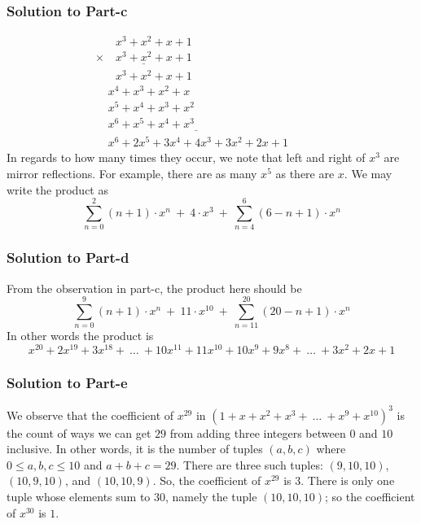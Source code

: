 \documentclass[12pt]{article}
\begin{document}
\subsubsection*{Solution to Part-c}
\begin{equation*}
	\begin{array}{c}
		\phantom{\times99}x^3+x^2+x+1\\
		\underline{\times\phantom{99} x^3+x^2+x+1}\\
		\phantom{\times99}x^3+x^2+x+1\\
		\phantom\times x^4+x^3+x^2+x\phantom{9999}\\
		\phantom\times x^5+x^4+x^3+x^2\phantom{99999999999}\\
		\underline{\phantom\times x^6+x^5+x^4+x^3\phantom{999999999999999999}}\\
		\phantom\times x^6+2x^5+3x^4+4x^3+3x^2+2x+1\phantom{9999999}
	\end{array}
\end{equation*}
In regards to how many times they occur, we note that left and right of $x^3$ are mirror reflections. For example, there are as many $x^5$ as there are $x$. We may write the product as
\[
\sum_{n=0}^{2}(n+1) \cdot x^n\ +\ 4 \cdot x^3\ +\ \sum_{n=4}^{6} (6-n+1) \cdot x^n
\]

\subsubsection*{Solution to Part-d}
From the observation in part-c, the product here should be
\[
\sum_{n=0}^{9}(n+1) \cdot x^n\ +\ 11 \cdot x^{10}\ +\ \sum_{n=11}^{20}(20-n+1) \cdot x^n
\]
In other words the product is 
\[
x^{20}+2x^{19}+3x^{18}+\ \ldots\ +10x^{11}+11x^{10}+10x^9+9x^8+\ \ldots\ +3x^2+2x+1
\]

\subsubsection*{Solution to Part-e}
We observe that the coefficient of $x^{29}$ in $\left( 1+x+x^2+x^3+\ \ldots\ +x^9+x^{10} \right)^3$ is the count of ways we can get $29$ from adding three integers between $0$ and $10$ inclusive. In other words, it is the number of tuples $(a, b, c)$ where\\ $0 \leq a,b,c \leq 10$ and $a+b+c=29$. There are three such tuples: $(9, 10, 10)$, $(10, 9, 10)$, and $(10, 10, 9)$. So, the coefficient of $x^{29}$ is $3$. There is only one tuple whose elements sum to $30$, namely the tuple $(10, 10, 10)$; so the coefficient of $x^{30}$ is $1$.
\end{document}
